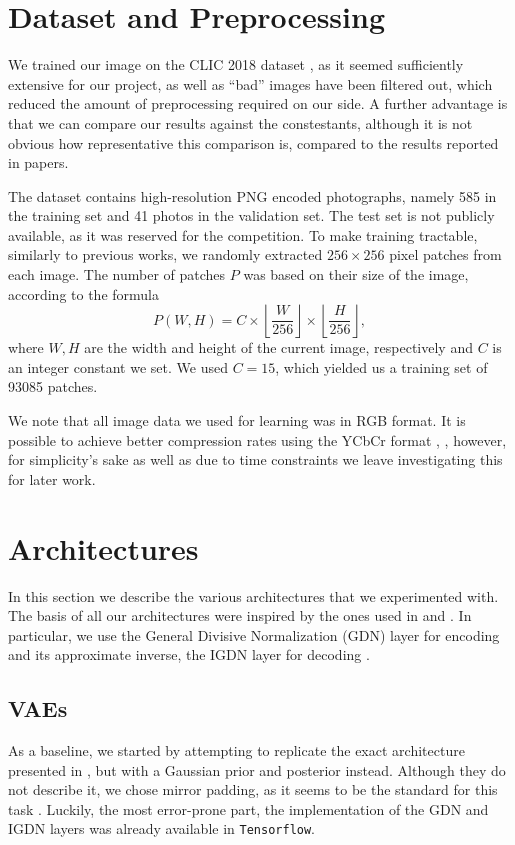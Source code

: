 \section{Dataset and Preprocessing}
\label{sec:dataset_preproc}
\par
We trained our image on the CLIC 2018 dataset \cite{clic2018}, as it seemed
sufficiently extensive for our project, as well as ``bad'' images have been
filtered out, which reduced the amount of preprocessing required on our side.
A further advantage is that we can compare our results against the constestants,
although it is not obvious how representative this comparison is, compared to
the results reported in papers.
\par
The dataset contains high-resolution PNG encoded photographs, namely 585 in the
training set and 41 photos in the validation set. The test set is not
publicly available, as it was reserved for the competition. 
To make training tractable, similarly to previous works, we randomly extracted
$256 \times 256$ pixel patches from each image. The number of patches $P$ was
based on their size of the image, according to the formula
\[
  P(W, H) = C \times \left \lfloor \frac{W}{256} \right \rfloor \times
  \left \lfloor \frac{H}{256} \right \rfloor,
\]
where $W, H$ are the width and height of the current image, respectively and $C$
is an integer constant we set. We used $C = 15$, which yielded us a training set
of 93085 patches.
\par
We note that all image data we used for learning was in RGB format. It is
possible to achieve better compression rates using the YCbCr format
\cite{balle2016end}, \cite{rippel2017real}, however, for simplicity's sake as
well as due to time constraints we leave investigating this for later work.
\section{Architectures}
\label{sec:architectures}
\par
In this section we describe the various architectures that we experimented with.
The basis of all our architectures were inspired by the ones used in
\cite{balle2016end} and \cite{balle2018variational}. In particular, we use the
General Divisive Normalization (GDN) layer for encoding and its approximate
inverse, the IGDN layer for decoding \cite{balle2015density} \cite{balle2016end}.

\subsection{VAEs}
\par
As a baseline, we started by attempting to replicate the exact architecture
presented in \cite{balle2016end}, but with a Gaussian prior and posterior
instead. Although they do not describe it, we chose mirror padding, as it seems
to be the standard for this task \cite{theis2017lossy}. Luckily, the most
error-prone part, the implementation of the GDN and IGDN layers was already
available in \texttt{Tensorflow}\footnotemark.

